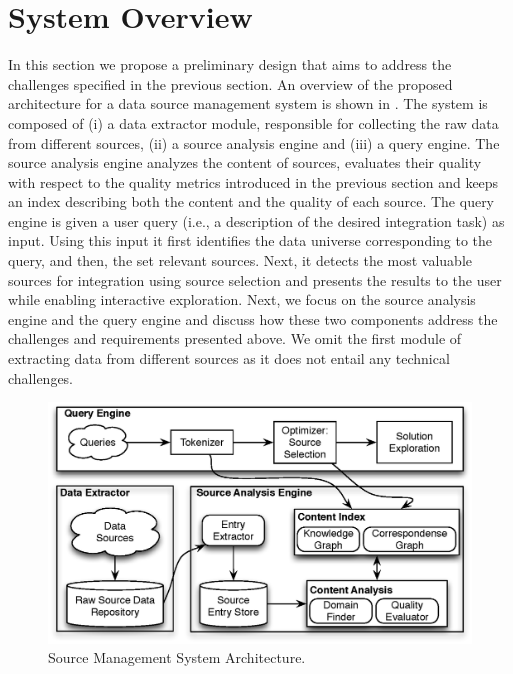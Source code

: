 \documentclass{sig-alternate}
\begin{document}
\section{System Overview}
\label{sec:overview}
In this section we propose a preliminary design that aims to address the challenges specified in the previous section. An overview of the proposed architecture for a data source management system is shown in . The system is composed of (i) a data extractor module, responsible for collecting the raw data from different sources, (ii) a source analysis engine and (iii) a query engine. The source analysis engine analyzes the content of sources, evaluates their quality with respect to the quality metrics introduced in the previous section and keeps an index describing both the content and the quality of each source. The query engine is given a user query (i.e., a description of the desired integration task) as input. Using this input it first identifies the data universe corresponding to the query, and then, the set relevant sources. Next, it detects the most valuable sources for integration using source selection and presents the results to the user while enabling interactive exploration. Next, we focus on the source analysis engine and the query engine and discuss how these two components address the challenges and requirements presented above. We omit the first module of extracting data from different sources as it does not entail any technical challenges.

\begin{figure}
	\begin{center}
	\includegraphics[clip,scale=0.5]{fig/system.eps}
	\caption{Source Management System Architecture.}
	\label{fig:system}
	\end{center}
\end{figure}
\end{document}
